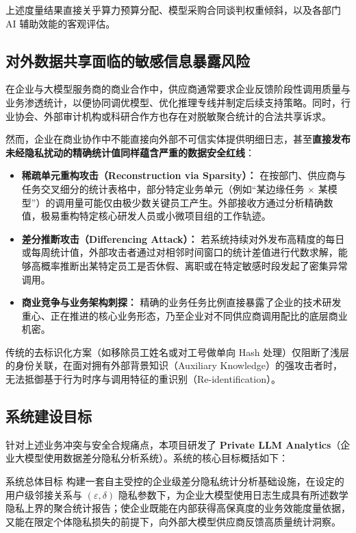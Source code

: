 上述度量结果直接关乎算力预算分配、模型采购合同谈判权重倾斜，以及各部门 AI 辅助效能的客观评估。

\subsection{对外数据共享面临的敏感信息暴露风险}
在企业与大模型服务商的商业合作中，供应商通常要求企业反馈阶段性调用质量与业务渗透统计，以便协同调优模型、优化推理专线并制定后续支持策略。同时，行业协会、外部审计机构或科研合作方也存在对脱敏聚合统计的合法共享诉求。

然而，企业在商业协作中不能直接向外部不可信实体提供明细日志，甚至\textbf{直接发布未经隐私扰动的精确统计值同样蕴含严重的数据安全红线}：
\begin{itemize}[leftmargin=2em]
  \item \textbf{稀疏单元重构攻击（Reconstruction via Sparsity）：} 在按部门、供应商与任务交叉细分的统计表格中，部分特定业务单元（例如“某边缘任务 $\times$ 某模型”）的调用量可能仅由极少数关键员工产生。外部接收方通过分析精确数值，极易重构特定核心研发人员或小微项目组的工作轨迹。
  \item \textbf{差分推断攻击（Differencing Attack）：} 若系统持续对外发布高精度的每日或每周统计值，外部攻击者通过对相邻时间窗口的统计差值进行代数求解，能够高概率推断出某特定员工是否休假、离职或在特定敏感时段发起了密集异常调用。
  \item \textbf{商业竞争与业务架构刺探：} 精确的业务任务比例直接暴露了企业的技术研发重心、正在推进的核心业务形态，乃至企业对不同供应商调用配比的底层商业机密。
\end{itemize}

传统的去标识化方案（如移除员工姓名或对工号做单向 Hash 处理）仅阻断了浅层的身份关联，在面对拥有外部背景知识（Auxiliary Knowledge）的强攻击者时，无法抵御基于行为时序与调用特征的重识别（Re-identification）。

\subsection{系统建设目标}
针对上述业务冲突与安全合规痛点，本项目研发了 \textbf{Private LLM Analytics}（企业大模型使用数据差分隐私分析系统）。系统的核心目标概括如下：
\begin{techbox}{系统总体目标}
构建一套自主受控的企业级差分隐私统计分析基础设施，在设定的用户级邻接关系与 $(\varepsilon, \delta)$ 隐私参数下，为企业大模型使用日志生成具有所述数学隐私上界的聚合统计报告；使企业既能在内部获得高保真度的业务效能度量依据，又能在限定个体隐私损失的前提下，向外部大模型供应商反馈高质量统计洞察。
\end{techbox}

